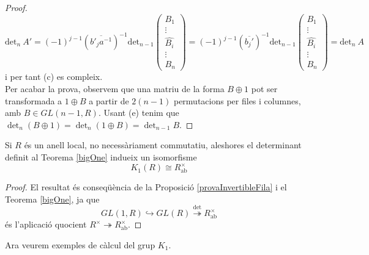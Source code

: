 \begin{proof}
$$
 \text{det}_n \ A' = (-1)^{j-1}(\overline{b'_ja^{-1}})^{-1} \text{det}_{n-1}
 \left(\begin{matrix}
  B_1  \\
  \vdots \\
  \hat{B_{i}} \\
  \vdots \\
  B_n 
 \end{matrix} \right)
 =
  (-1)^{j-1}(\overline{b_j'})^{-1} \text{det}_{n-1}
 \left(\begin{matrix}
  B_1  \\
  \vdots \\
  \hat{B_{i}} \\
  \vdots \\
  B_n 
 \end{matrix} \right)
 =\text{det}_n \ A
$$
 i per tant (c) es compleix. \\
 \indent Per acabar la prova, observem que una matriu de la forma $B\oplus 1$ pot ser transformada a $1\oplus B$ a partir de $2(n-1)$ permutacions per files i columnes, amb $B\in GL(n-1,R)$. Usant (e) tenim que $\det_n(B\oplus 1) = \det_n(1\oplus B) = \det_{n-1}B$.
\end{proof}

\begin{corollary}\label{mainCorollary}
Si $R$ és un anell local, no necessàriament commutatiu, aleshores el determinant definit al Teorema \ref{bigOne} indueix un isomorfisme
$$
K_1(R)\cong R^\times_{\text{ab}}
$$
\end{corollary}

\begin{proof}
El resultat és conseqüència de la Proposició \ref{provaInvertibleFila} i el Teorema \ref{bigOne}, ja que 
$$
GL(1,R)\hookrightarrow GL(R) \overset{{\det}}{ \twoheadrightarrow } R^\times_{\text{ab}}
$$ 
és l'aplicació quocient $R^\times \twoheadrightarrow R^\times_\text{ab}$.
\end{proof}

Ara veurem exemples de càlcul del grup $K_1$.

